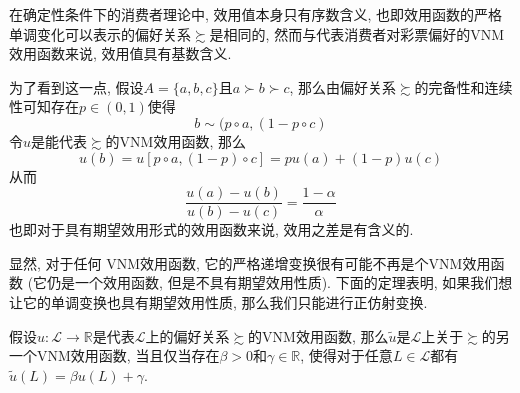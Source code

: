 \documentclass[cn, 12pt, math=mtpro2, bibstyle=apa, blue]{elegantbook}
\newcommand{\R}{\mathbb{R}}
\begin{document}
\begin{example}
在确定性条件下的消费者理论中, 效用值本身只有序数含义, 也即效用函数的严格单调变化可以表示的偏好关系$\succsim$是相同的, 然而与代表消费者对彩票偏好的VNM效用函数来说, 效用值具有基数含义.

为了看到这一点, 假设$A=\{a,b,c\}$且$a\succ b \succ c$, 那么由偏好关系$\succsim$的完备性和连续性可知存在$p\in (0,1)$使得
$$b\sim (p\circ a, (1-p\circ c)$$
令$u$是能代表$\succsim$的VNM效用函数, 那么
$$u(b)=u[p\circ a, (1-p)\circ c]=pu(a)+(1-p)u(c)$$
从而
$$\frac{u(a)-u(b)}{u(b)-u(c)}=\frac{1-\alpha}{\alpha}$$
也即对于具有期望效用形式的效用函数来说, 效用之差是有含义的.

显然, 对于任何 VNM效用函数, 它的严格递增变换很有可能不再是个VNM效用函数 (它仍是一个效用函数, 但是不具有期望效用性质). 下面的定理表明, 如果我们想让它的单调变换也具有期望效用性质, 那么我们只能进行正仿射变换.
\end{example}
\begin{theorem}
  假设$u:\mathscr{L}\to\R$是代表$\mathscr{L}$上的偏好关系$\succsim$的VNM效用函数, 那么$\tilde{u}$是$\mathscr{L}$上关于$\succsim$的另一个VNM效用函数, 当且仅当存在$\beta>0$和$\gamma\in\R$, 使得对于任意$L\in\mathscr{L}$都有$\tilde{u}(L)=\beta u(L)+\gamma$.
\end{theorem}
\end{document}
